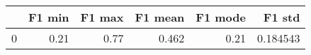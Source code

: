 \begin{tabular}{lrrrrr}
\toprule
{} &  F1 min &  F1 max &  F1 mean &  F1 mode &    F1 std \\
\midrule
0 &    0.21 &    0.77 &    0.462 &     0.21 &  0.184543 \\
\bottomrule
\end{tabular}
